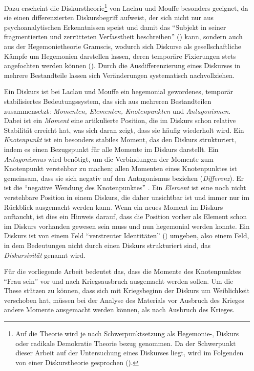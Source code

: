 \documentclass[12pt, titlepage=true, toc=bib]{scrartcl}
\begin{document}
Dazu erscheint die Diskurstheorie\footnote{Auf die Theorie wird je nach Schwerpunktsetzung als Hegemonie-, Diskurs oder radikale Demokratie Theorie bezug genommen. Da der Schwerpunkt dieser Arbeit auf der Untersuchung eines Diskurses liegt, wird im Folgenden von einer Diskurstheorie gesprochen (\cite[vgl.][]{nonhoff_diskurs_2007-1}).} von Laclau und Mouffe besonders geeignet, da sie einen differenzierten Diskursbegriff aufweist, der sich nicht nur aus psychoanalytischen Erkenntnissen speist und damit das "`Subjekt in seiner fragmentierten und zerrütteten Verfasstheit beschreiben"' (\cite[198]{nonhoff_kollektive_2007}) kann, sondern auch aus der Hegemonietheorie Gramscis, wodurch sich Diskurse als gesellschaftliche Kämpfe um Hegemonien darstellen lassen, deren temporäre Fixierungen stets angefochten werden können (\cite[vgl.][8-9]{nonhoff_diskurs_2007-1}). Durch die Ausdifferenzierung eines Diskurses in mehrere Bestandteile lassen sich Veränderungen systematisch nachvollziehen.

Ein Diskurs ist bei Laclau und Mouffe ein hegemonial gewordenes, temporär stabilisiertes Bedeutungssystem, das sich aus mehreren Bestandteilen zusammensetzt: \textit{Momenten, Elementen, Knotenpunkten} und \textit{Antagonismen}. Dabei ist ein \textit{Moment} eine artikulierte Position, die im Diskurs schon relative Stabilität erreicht hat, was sich daran zeigt, dass sie häufig wiederholt wird. Ein \textit{Knotenpunkt} ist ein besonders stabiles Moment, das den Diskurs strukturiert, indem es einen Bezugspunkt für alle Momente im Diskurs darstellt. Ein \textit{Antagonismus} wird benötigt, um die Verbindungen der Momente zum Knotenpunkt verstehbar zu machen; allen Momenten eines Knotenpunktes ist gemeinsam, dass sie sich negativ auf den Antagonismus beziehen (\textit{Differenz}). Er ist die "`negative Wendung des Knotenpunktes"' \cite[6]{bruell_chancen_2006}. Ein \textit{Element} ist eine noch nicht verstehbare Position in einem Diskurs, die daher unsichtbar ist und immer nur im Rückblick ausgemacht werden kann. Wenn ein neues Moment im Diskurs auftaucht, ist dies ein Hinweis darauf, dass die Position vorher als Element schon im Diskurs vorhanden gewesen sein muss und nun hegemonial werden konnte. Ein Diskurs ist von einem Feld "`verstreuter Identitäten"' (\cite[vgl.][6]{bruell_chancen_2006}) umgeben, also einem Feld, in dem Bedeutungen nicht durch einen Diskurs strukturiert sind, das \textit{Diskursivität} genannt wird. 

Für die vorliegende Arbeit bedeutet das, dass die Momente des Knotenpunktes "`Frau sein"' vor und nach Kriegsausbruch ausgemacht werden sollen. Um die These stützen zu können, dass sich mit Kriegsbeginn der Diskurs um Weiblichkeit verschoben hat, müssen bei der Analyse des Materials vor Ausbruch des Krieges andere Momente ausgemacht werden können, als nach Ausbruch des Krieges. 
\end{document}
